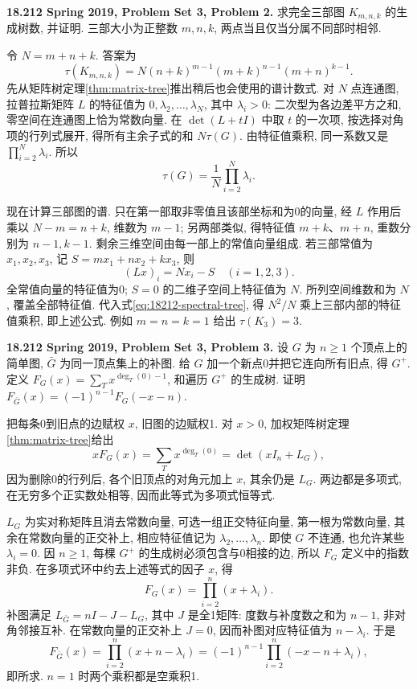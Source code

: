 \begin{exercise}\label{mit:18212-pset3-q2}
\textbf{18.212 Spring 2019, Problem Set 3, Problem 2.}
求完全三部图 $K_{m,n,k}$ 的生成树数, 并证明. 三部大小为正整数 $m,n,k$, 两点当且仅当分属不同部时相邻.
\end{exercise}
\begin{solution}
令 $N=m+n+k$. 答案为
\[
 \tau(K_{m,n,k})
  =N(n+k)^{m-1}(m+k)^{n-1}(m+n)^{k-1}.
\]
先从矩阵树定理\ref{thm:matrix-tree}推出稍后也会使用的谱计数式. 对 $N$ 点连通图, 拉普拉斯矩阵 $L$ 的特征值为 $0,\lambda_2,\ldots,\lambda_N$, 其中 $\lambda_i>0$: 二次型为各边差平方之和, 零空间在连通图上恰为常数向量. 在 $\det(L+tI)$ 中取 $t$ 的一次项, 按选择对角项的行列式展开, 得所有主余子式的和 $N\tau(G)$. 由特征值乘积, 同一系数又是 $\prod_{i=2}^N\lambda_i$. 所以
\begin{equation}\label{eq:18212-spectral-tree}
 \tau(G)=\frac1N\prod_{i=2}^N\lambda_i.
\end{equation}

现在计算三部图的谱. 只在第一部取非零值且该部坐标和为0的向量, 经 $L$ 作用后乘以 $N-m=n+k$, 维数为 $m-1$; 另两部类似, 得特征值 $m+k$、$m+n$, 重数分别为 $n-1,k-1$. 剩余三维空间由每一部上的常值向量组成. 若三部常值为 $x_1,x_2,x_3$, 记 $S=mx_1+nx_2+kx_3$, 则
\[
 (Lx)_i=Nx_i-S\quad(i=1,2,3).
\]
全常值向量的特征值为0; $S=0$ 的二维子空间上特征值为 $N$. 所列空间维数和为 $N$, 覆盖全部特征值. 代入式\eqref{eq:18212-spectral-tree}, 得 $N^2/N$ 乘上三部内部的特征值乘积, 即上述公式. 例如 $m=n=k=1$ 给出 $\tau(K_3)=3$.
\end{solution}

\begin{exercise}\label{mit:18212-pset3-q3}
\textbf{18.212 Spring 2019, Problem Set 3, Problem 3.}
设 $G$ 为 $n\ge1$ 个顶点上的简单图, $\bar G$ 为同一顶点集上的补图. 给 $G$ 加一个新点0并把它连向所有旧点, 得 $G^+$. 定义
$F_G(x)=\sum_T x^{\deg_T(0)-1}$, 和遍历 $G^+$ 的生成树. 证明
$F_{\bar G}(x)=(-1)^{n-1}F_G(-x-n)$.
\end{exercise}
\begin{solution}
把每条0到旧点的边赋权 $x$, 旧图的边赋权1. 对 $x>0$, 加权矩阵树定理\ref{thm:matrix-tree}给出
\[
 xF_G(x)=\sum_T x^{\deg_T(0)}=\det(xI_n+L_G),
\]
因为删除0的行列后, 各个旧顶点的对角元加上 $x$, 其余仍是 $L_G$. 两边都是多项式, 在无穷多个正实数处相等, 因而此等式为多项式恒等式.

$L_G$ 为实对称矩阵且消去常数向量, 可选一组正交特征向量, 第一根为常数向量, 其余在常数向量的正交补上, 相应特征值记为 $\lambda_2,\ldots,\lambda_n$. 即使 $G$ 不连通, 也允许某些 $\lambda_i=0$. 因 $n\ge1$, 每棵 $G^+$ 的生成树必须包含与0相接的边, 所以 $F_G$ 定义中的指数非负. 在多项式环中约去上述等式的因子 $x$, 得
\[
 F_G(x)=\prod_{i=2}^n(x+\lambda_i).
\]
补图满足 $L_{\bar G}=nI-J-L_G$, 其中 $J$ 是全1矩阵: 度数与补度数之和为 $n-1$, 非对角邻接互补. 在常数向量的正交补上 $J=0$, 因而补图对应特征值为 $n-\lambda_i$. 于是
\[
 F_{\bar G}(x)=\prod_{i=2}^n(x+n-\lambda_i)
   =(-1)^{n-1}\prod_{i=2}^n(-x-n+\lambda_i),
\]
即所求. $n=1$ 时两个乘积都是空乘积1.
\end{solution}

